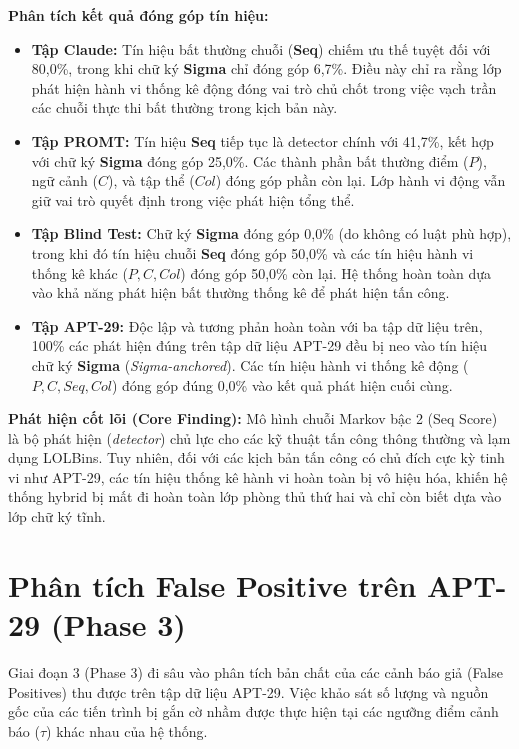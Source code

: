 \documentclass[../main.tex]{subfiles}
\begin{document}
\textbf{Phân tích kết quả đóng góp tín hiệu:}
\begin{itemize}
    \item \textbf{Tập Claude:} Tín hiệu bất thường chuỗi (\textbf{Seq}) chiếm ưu thế tuyệt đối với 80,0\%, trong khi chữ ký \textbf{Sigma} chỉ đóng góp 6,7\%. Điều này chỉ ra rằng lớp phát hiện hành vi thống kê động đóng vai trò chủ chốt trong việc vạch trần các chuỗi thực thi bất thường trong kịch bản này.
    \item \textbf{Tập PROMT:} Tín hiệu \textbf{Seq} tiếp tục là detector chính với 41,7\%, kết hợp với chữ ký \textbf{Sigma} đóng góp 25,0\%. Các thành phần bất thường điểm ($P$), ngữ cảnh ($C$), và tập thể ($Col$) đóng góp phần còn lại. Lớp hành vi động vẫn giữ vai trò quyết định trong việc phát hiện tổng thể.
    \item \textbf{Tập Blind Test:} Chữ ký \textbf{Sigma} đóng góp 0,0\% (do không có luật phù hợp), trong khi đó tín hiệu chuỗi \textbf{Seq} đóng góp 50,0\% và các tín hiệu hành vi thống kê khác ($P, C, Col$) đóng góp 50,0\% còn lại. Hệ thống hoàn toàn dựa vào khả năng phát hiện bất thường thống kê để phát hiện tấn công.
    \item \textbf{Tập APT-29:} Độc lập và tương phản hoàn toàn với ba tập dữ liệu trên, 100\% các phát hiện đúng trên tập dữ liệu APT-29 đều bị neo vào tín hiệu chữ ký \textbf{Sigma} (\textit{Sigma-anchored}). Các tín hiệu hành vi thống kê động ($P, C, Seq, Col$) đóng góp đúng 0,0\% vào kết quả phát hiện cuối cùng.
\end{itemize}

\textbf{Phát hiện cốt lõi (Core Finding):}
Mô hình chuỗi Markov bậc 2 (Seq Score) là bộ phát hiện (\textit{detector}) chủ lực cho các kỹ thuật tấn công thông thường và lạm dụng LOLBins. Tuy nhiên, đối với các kịch bản tấn công có chủ đích cực kỳ tinh vi như APT-29, các tín hiệu thống kê hành vi hoàn toàn bị vô hiệu hóa, khiến hệ thống hybrid bị mất đi hoàn toàn lớp phòng thủ thứ hai và chỉ còn biết dựa vào lớp chữ ký tĩnh.

\section{Phân tích False Positive trên APT-29 (Phase 3)}
\label{section:3.4}

Giai đoạn 3 (Phase 3) đi sâu vào phân tích bản chất của các cảnh báo giả (False Positives) thu được trên tập dữ liệu APT-29. Việc khảo sát số lượng và nguồn gốc của các tiến trình bị gắn cờ nhầm được thực hiện tại các ngưỡng điểm cảnh báo ($\tau$) khác nhau của hệ thống.
\end{document}
